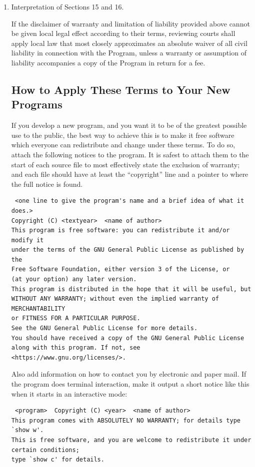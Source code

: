 \documentclass{article}
\begin{document}
\begin{enumerate}[\hspace{-18pt}1.]
\item Interpretation of Sections 15 and 16.

If the disclaimer of warranty and limitation of liability provided above cannot be given local legal effect according to their terms, reviewing courts shall apply local law that most closely approximates an absolute waiver of all civil liability in connection with the Program, unless a warranty or assumption of liability accompanies a copy of the Program in return for a fee.

\subsection{How to Apply These Terms to Your New Programs}

If you develop a new program, and you want it to be of the greatest possible use to the public, the best way to achieve this is to make it free software which everyone can redistribute and change under these terms.
To do so, attach the following notices to the program.  It is safest to attach them to the start of each source file to most effectively state the exclusion of warranty; and each file should have at least the ``copyright'' line and a pointer to where the full notice is found.

\begin{samepage}\footnotesize\begin{verbatim} <one line to give the program's name and a brief idea of what it does.>
Copyright (C) <textyear>  <name of author>
This program is free software: you can redistribute it and/or modify it 
under the terms of the GNU General Public License as published by the 
Free Software Foundation, either version 3 of the License, or 
(at your option) any later version.
This program is distributed in the hope that it will be useful, but 
WITHOUT ANY WARRANTY; without even the implied warranty of MERCHANTABILITY 
or FITNESS FOR A PARTICULAR PURPOSE.
See the GNU General Public License for more details.
You should have received a copy of the GNU General Public License 
along with this program. If not, see <https://www.gnu.org/licenses/>. 
\end{verbatim}\end{samepage}

Also add information on how to contact you by electronic and paper mail.
If the program does terminal interaction, make it output a short notice like this when it starts in an interactive mode:
{\footnotesize \begin{verbatim} <program>  Copyright (C) <year>  <name of author>
This program comes with ABSOLUTELY NO WARRANTY; for details type `show w'. 
This is free software, and you are welcome to redistribute it under certain conditions; 
type `show c' for details. \end{verbatim} }


\end{enumerate}
\end{document}
